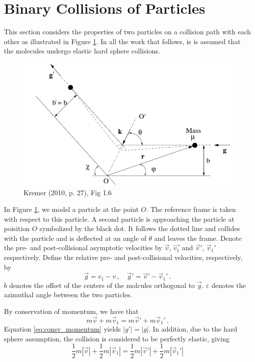 \documentclass[12pt]{CSUNthesis}
\newcommand{\vecv}{\vec{v}}
\begin{document}
\section{Binary Collisions of Particles}
\label{sec:bincol}
	This section considers the properties of two particles on a collision path with each other as illustrated in Figure \ref{fig:binary_collision}. In all the work that follows, is is assumed that the molecules undergo elastic hard sphere collisions. 
\begin{figure}[h]
	\centering
	\includegraphics[scale=.5]{binary_collision}
	\caption{Kremer (2010, p. 27), Fig 1.6}
	\label{fig:binary_collision}
\end{figure}
	In Figure \ref{fig:binary_collision}, we model a particle at the point $O$. The reference frame is taken with respect to this particle. A second particle is approaching the particle at poisition $O$ symbolized by the black dot. It follows the dotted line and collides with the particle and is deflected at an angle of $\theta$ and leaves the frame.
	 Denote the pre- and post-collisional asymptotic velocities by $\vec{v}$, $\vec{v_1}$ and $\vec{v}'$, $\vec{v}_1'$ respectively. Define the relative pre- and post-collisional velocities, respectively, by 
\begin{equation*}
	\vec{g} = v_1 - v\, , \quad \vec{g}' = \vec{v}'-\vec{v}_1' \, .
\end{equation*}
$b$ denotes the offset of the centers of the molcules orthogonal to $\vec{g}$. $\varepsilon$ denotes the azimuthal angle between the two particles. 

By conservation of momentum, we have that 
\begin{equation}
\label{eq:consv_momentum}
m \vecv + m \vecv_1 = m\vecv' + m\vecv_1'\, .
\end{equation}
Equation \ref{eq:consv_momentum} yields $|g'| = |g|$. In addition, due to the hard sphere assumption, the collision is considered to be perfectly elastic, giving
\begin{equation}
\label{eq:consv_kin}
\frac{1}{2} m|\vecv| + \frac{1}{2} m|\vecv_1| = \frac{1}{2}m|\vecv'| + \frac{1}{2}m|\vecv_1'|
\end{equation}
\end{document}
